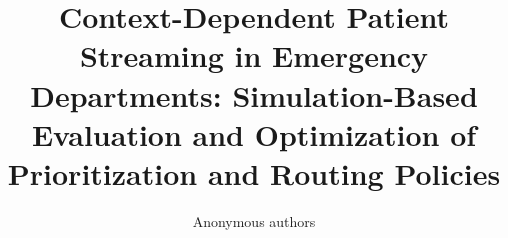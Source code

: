 \documentclass[12pt,onecolumn,draftclsnofoot,journal]{IEEEtran}
\begin{document}
\title{Context-Dependent Patient Streaming in Emergency Departments: Simulation-Based Evaluation and Optimization of Prioritization and Routing Policies}
\author{Anonymous authors}
\maketitle







\end{document}
